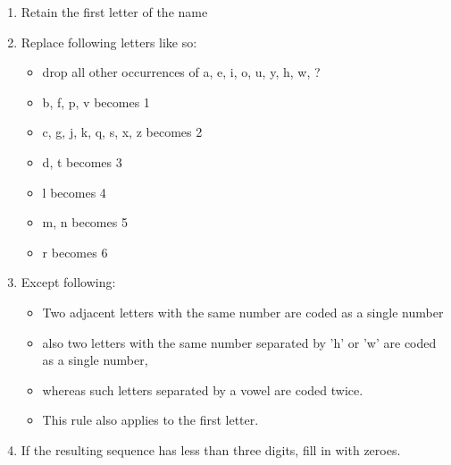\documentclass[a4paper,12pt]{article}
\begin{document}
\begin{enumerate}
    \item Retain the first letter of the name 
    \item Replace following letters like so:\begin{itemize}
            \item drop all other occurrences of a, e, i, o, u, y, h, w, ?
            \item b, f, p, v becomes 1
            \item c, g, j, k, q, s, x, z becomes 2
            \item d, t becomes 3
            \item l becomes 4
            \item m, n becomes 5
            \item r becomes 6
        \end{itemize}
    \item Except following:\begin{itemize}
            \item Two adjacent letters with the same number are coded as a
                single number
            \item also two letters with the same number separated by 'h' or 'w'
                are coded as a single number,
            \item whereas such letters separated by a vowel are coded twice.
            \item This rule also applies to the first letter.
        \end{itemize}
    \item If the resulting sequence has less than three digits, fill in with
        zeroes.
\end{enumerate}
\end{document}
